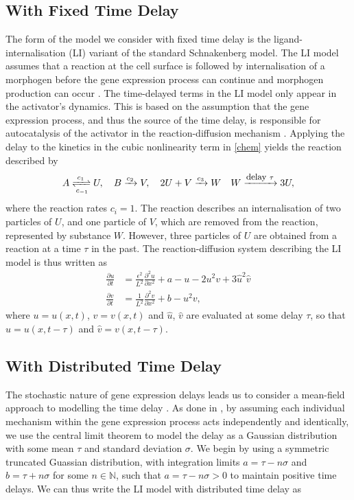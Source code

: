\subsection{With Fixed Time Delay}

The form of the model we consider with fixed time delay is the ligand-internalisation (LI) variant of the standard Schnakenberg model. The LI model assumes that a reaction at the cell surface is followed by internalisation of a morphogen before the gene expression process can continue and morphogen production can occur \cite{leegaffney,yigaffneyli}. The time-delayed terms in the LI model only appear in the activator's dynamics. This is based on the assumption that the gene expression process, and thus the source of the time delay, is responsible for autocatalysis of the activator in the reaction-diffusion mechanism \cite{gaffmonk}. Applying the delay to the kinetics in the cubic nonlinearity term \cite{baker} in \eqref{chem} yields the reaction described by
\begin{equation}\label{chem2}
A\xrightleftharpoons[c_{-1}]{c_1} U,\quad B\xrightarrow{c_2} V,\quad 2U+V\xrightarrow{c_3} W\quad W\xrightarrow{\text{\footnotesize delay } \tau}3U,
\end{equation}
where the reaction rates $c_i=1$. The reaction describes an internalisation of two particles of $U$, and one particle of $V$, which are removed from the reaction, represented by substance $W$. However, three particles of $U$ are obtained from a reaction at a time $\tau$ in the past. The reaction-diffusion system describing the LI model is thus written as \cite{leegaffney}
\begin{equation}\label{fixed}
  \begin{split}
  \frac{\partial u}{\partial t}&=\frac{\epsilon^2}{L^2}\frac{\partial^2u}{\partial x^2}+a-u-2u^2v+3\hat{u}^2\hat{v}\\
  \frac{\partial v}{\partial t}&=\frac{1}{L^2}\frac{\partial^2v}{\partial x^2}+b-u^2v,
\end{split}
\end{equation}
where $u=u(x,t)$, $v=v(x,t)$ and $\hat{u}$, $\hat{v}$ are evaluated at some delay $\tau$, so that $\hat{u}=u(x,t-\tau)$ and $\hat{v}=v(x,t-\tau)$.

\subsection{With Distributed Time Delay}

The stochastic nature of gene expression delays leads us to consider a mean-field approach to modelling the time delay \cite{bratsun,krausenew}. As done in \cite{william}, by assuming each individual mechanism within the gene expression process acts independently and identically, we use the central limit theorem to model the delay as a Gaussian distribution with some mean $\tau$ and standard deviation $\sigma$. We begin by using a symmetric truncated Guassian distribution, with integration limits $a=\tau-n\sigma$ and $b=\tau+n\sigma$ for some $n\in\mathbb{N}$, such that $a=\tau-n\sigma>0$ to maintain positive time delays. We can thus write the LI model with distributed time delay as

